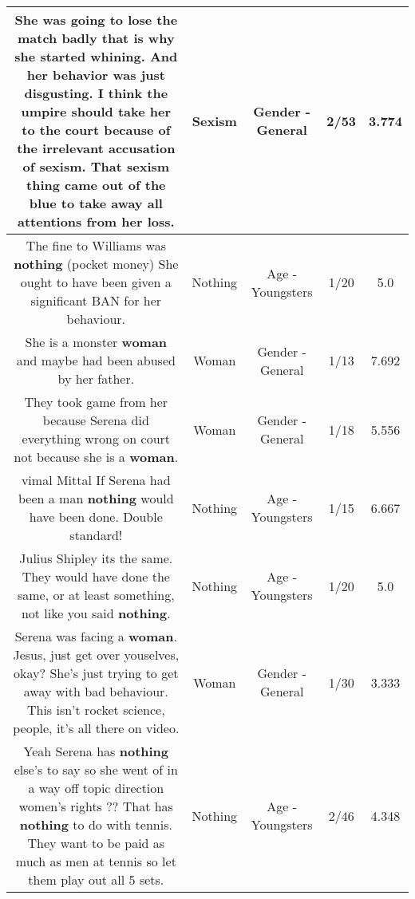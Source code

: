\documentclass[11pt]{article}
\newlength\mylength
\begin{document}
\begin{center}
\begin{longtable}{|C{.65\mylength}|C{.30\mylength}|C{.12\mylength}|C{.12\mylength}|C{.12\mylength}|}
  \small She was going to lose the match badly that is why she started whining. And her behavior was just disgusting. I think the umpire should take her to the court because of the irrelevant accusation of \textbf{sexism}. That \textbf{sexism} thing came out of the blue to take away all attentions from her loss.\normalsize   & Sexism & Gender - General & 2/53 & 3.774 \\  \hline
  \small The fine to Williams was \textbf{nothing} (pocket money)  She ought to have been given a significant BAN for her behaviour.\normalsize   & Nothing & Age - Youngsters & 1/20 & 5.0 \\  \hline
  \small She is a monster \textbf{woman} and maybe had been abused by her father.\normalsize   & Woman & Gender - General & 1/13 & 7.692 \\  \hline
  \small They took game from her because Serena did everything wrong on court not because she is a \textbf{woman}.\normalsize   & Woman & Gender - General & 1/18 & 5.556 \\  \hline
  \small vimal Mittal If Serena had been a man \textbf{nothing} would have been done.  Double standard!\normalsize   & Nothing & Age - Youngsters & 1/15 & 6.667 \\  \hline
  \small Julius Shipley its the same. They would have done the same, or at least something, not like you said \textbf{nothing}.\normalsize   & Nothing & Age - Youngsters & 1/20 & 5.0 \\  \hline
  \small Serena was facing a \textbf{woman}. Jesus, just get over youselves, okay? She's just trying to get away with bad behaviour. This isn't rocket science, people, it's all there on video.\normalsize   & Woman & Gender - General & 1/30 & 3.333 \\  \hline
  \small Yeah Serena has \textbf{nothing} else's to say so she went of in a way off topic direction women's rights ?? That has \textbf{nothing} to do with tennis. They want to be paid as much as men at tennis so let them play out all 5 sets.\normalsize   & Nothing & Age - Youngsters & 2/46 & 4.348 \\  \hline

\end{longtable}
\end{center}
\end{document}

